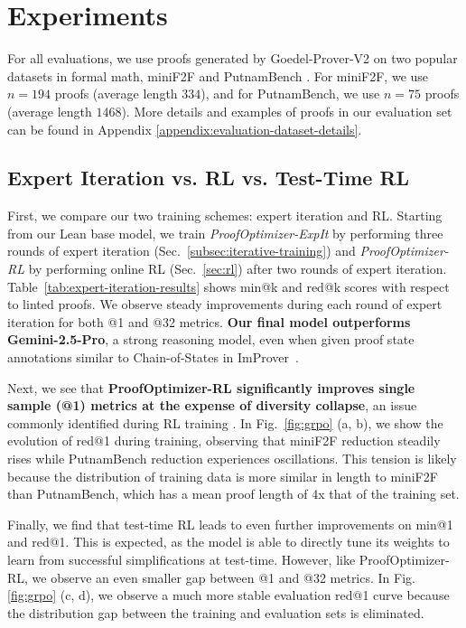 \section{Experiments}
\label{sec:experiments}

For all evaluations, we use proofs generated by Goedel-Prover-V2 \citep{lin2025goedel} on two popular datasets in formal math, miniF2F \citep{zheng2021minif2f} and PutnamBench \citep{tsoukalas2024putnambench}. For miniF2F, we use $n=194$ proofs (average length $334$), and for PutnamBench, we use $n=75$ proofs (average length $1468$). More details and examples of proofs in our evaluation set can be found in Appendix \ref{appendix:evaluation-dataset-details}.

\subsection{Expert Iteration vs. RL vs. Test-Time RL}
\label{sec:expit-rl}
First, we compare our two training schemes: expert iteration and RL. Starting from our Lean base model, we train \textit{ProofOptimizer-ExpIt} by performing three rounds of expert iteration (Sec.~\ref{subsec:iterative-training}) and \textit{ProofOptimizer-RL} by performing online RL (Sec.~\ref{sec:rl}) after two rounds of expert iteration. Table~\ref{tab:expert-iteration-results} shows min@k and red@k scores with respect to linted proofs. We observe steady improvements during each round of expert iteration for both @1 and @32 metrics. \textbf{Our final model outperforms Gemini-2.5-Pro}, a strong reasoning model, even when given proof state annotations similar to Chain-of-States in ImProver~\citep{ahuja2024improver}.


Next, we see that \textbf{ProofOptimizer-RL significantly improves single sample (@1) metrics at the expense of diversity collapse}, an issue commonly identified during RL training \citep{gehring2024rlef, walder2025pass,yue2025doesreinforcementlearningreally}. In Fig.~\ref{fig:grpo} (a, b), we show the evolution of red@1 during training, observing that miniF2F reduction steadily rises while PutnamBench reduction experiences oscillations. This tension is likely because the distribution of training data is more similar in length to miniF2F than PutnamBench, which has a mean proof length of 4x that of the training set.

Finally, we find that test-time RL leads to even further improvements on min@1 and red@1. This is expected, as the model is able to directly tune its weights to learn from successful simplifications at test-time. However, like ProofOptimizer-RL, we observe an even smaller gap between @1 and @32 metrics. In Fig. \ref{fig:grpo} (c, d), we observe a much more stable evaluation red@1 curve because the distribution gap between the training and evaluation sets is eliminated. 

